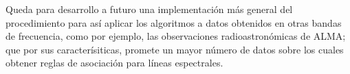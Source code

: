 \begin{intro}
Queda para desarrollo a futuro una implementación más general del procedimiento para así aplicar los algoritmos a datos obtenidos en otras bandas de frecuencia, como por ejemplo, las observaciones radioastronómicas de ALMA; que por sus caracterísiticas, promete un mayor número de datos sobre los cuales obtener reglas de asociación para líneas espectrales.

\end{intro}